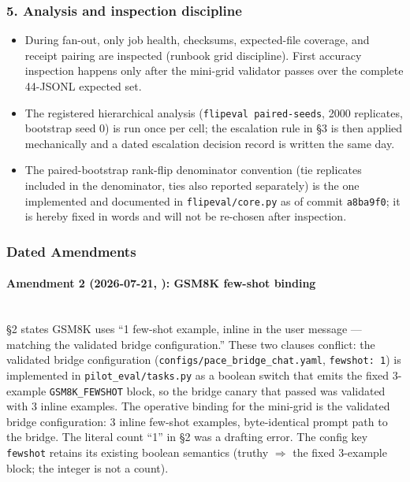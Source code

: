 \subsubsection{5. Analysis and inspection discipline}
\begin{itemize}
\item During fan-out, only job health, checksums, expected-file coverage, and receipt pairing are inspected (runbook grid discipline). First accuracy inspection happens only after the mini-grid validator passes over the complete 44-JSONL expected set.
\item The registered hierarchical analysis (\texttt{flipeval paired-\allowbreak{}seeds}, 2000 replicates, bootstrap seed 0) is run once per cell; the escalation rule in \S{}3 is then applied mechanically and a dated escalation decision record is written the same day.
\item The paired-bootstrap rank-flip denominator convention (tie replicates included in the denominator, ties also reported separately) is the one implemented and documented in \texttt{flipeval/\allowbreak{}core.py} as of commit \texttt{a8ba9f0}; it is hereby fixed in words and will not be re-chosen after inspection.
\end{itemize}
\subsubsection{Dated Amendments}
\paragraph{Amendment 2 (2026-07-21, \authorname{}): GSM8K few-shot binding}
\mbox{}\\
\S{}2 states GSM8K uses ``1 few-shot example, inline in the user message --- matching the validated bridge configuration.'' These two clauses conflict: the validated bridge configuration (\texttt{configs/\allowbreak{}pace\_bridge\_chat.yaml}, \texttt{fewshot: 1}) is implemented in \texttt{pilot\_eval/\allowbreak{}tasks.py} as a boolean switch that emits the fixed 3-example \texttt{GSM8K\_FEWSHOT} block, so the bridge canary that passed was validated with 3 inline examples. The operative binding for the mini-grid is the validated bridge configuration: 3 inline few-shot examples, byte-identical prompt path to the bridge. The literal count ``1'' in \S{}2 was a drafting error. The config key \texttt{fewshot} retains its existing boolean semantics (truthy $\Rightarrow$ the fixed 3-example block; the integer is not a count).

